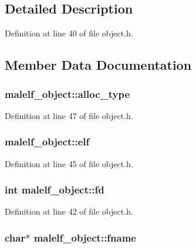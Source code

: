 \subsection{Detailed Description}


Definition at line 40 of file object.h.



\subsection{Member Data Documentation}
\hypertarget{structmalelf__object_a458bc33779f59e8534c7529cd6791043}{
\subsubsection[{alloc\_\-type}]{ {\bf malelf\_\-object::alloc\_\-type}}}
\label{structmalelf__object_a458bc33779f59e8534c7529cd6791043}


Definition at line 47 of file object.h.

\hypertarget{structmalelf__object_aaed8855ad6d68c50f72ec6a9d61dcefb}{
\subsubsection[{elf}]{ {\bf malelf\_\-object::elf}}}
\label{structmalelf__object_aaed8855ad6d68c50f72ec6a9d61dcefb}


Definition at line 45 of file object.h.

\hypertarget{structmalelf__object_ae97de1bc2fbeea9832e6a967953d2446}{
\subsubsection[{fd}]{\setlength{\rightskip}{0pt plus 5cm}int {\bf malelf\_\-object::fd}}}
\label{structmalelf__object_ae97de1bc2fbeea9832e6a967953d2446}


Definition at line 42 of file object.h.

\hypertarget{structmalelf__object_a726458fb460f6a24831c86c8b38c0266}{
\subsubsection[{fname}]{\setlength{\rightskip}{0pt plus 5cm}char$\ast$ {\bf malelf\_\-object::fname}}}
\label{structmalelf__object_a726458fb460f6a24831c86c8b38c0266}


